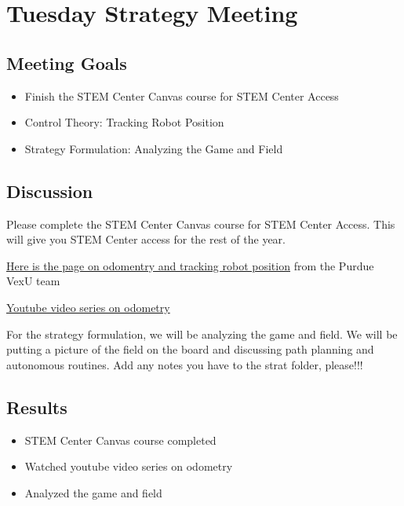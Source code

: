 \section{Tuesday Strategy Meeting}

\subsection{Meeting Goals}
\begin{itemize}
    \item Finish the STEM Center Canvas course for STEM Center Access
    \item Control Theory: Tracking Robot Position
    \item Strategy Formulation: Analyzing the Game and Field
\end{itemize}

\subsection{Discussion}


Please complete the STEM Center Canvas course for STEM Center Access. This will give you STEM Center access for the rest of the year.

\href{https://wiki.purduesigbots.com/software/odometry}{Here is the page on odomentry and tracking robot position} from the Purdue VexU team

\href{https://www.youtube.com/watch?v=GEZBYHVHmFQ}{Youtube video series on odometry}

For the strategy formulation, we will be analyzing the game and field. We will be putting a picture of the field on the board and discussing path planning and autonomous routines. Add any notes you have to the strat folder, please!!!

\subsection{Results}
\begin{itemize}
    \item STEM Center Canvas course completed
    \item Watched youtube video series on odometry
    \item Analyzed the game and field
\end{itemize}